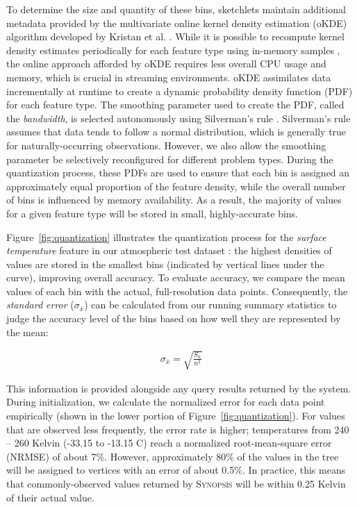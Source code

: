 To determine the size and quantity of these bins, sketchlets maintain additional metadata provided by the multivariate online kernel density estimation (oKDE) algorithm developed by Kristan et al. \cite{kristan2011multivariate}. While it is possible to recompute kernel density estimates periodically for each feature type using in-memory samples \cite{malensek2013autonomously}, the online approach afforded by oKDE requires less overall CPU usage and memory, which is crucial in streaming environments.  oKDE assimilates data incrementally at runtime to create a dynamic probability density function (PDF) for each feature type. The smoothing parameter used to create the PDF, called the \emph{bandwidth}, is selected autonomously using Silverman's rule \cite{silverman1986density}. Silverman's rule assumes that data tends to follow a normal distribution, which is generally true for naturally-occurring observations. However, we also allow the smoothing parameter be selectively reconfigured for different problem types. During the quantization process, these PDFs are used to ensure that each bin is assigned an approximately equal proportion of the feature density, while the overall number of bins is influenced by memory availability. As a result, the majority of values for a given feature type will be stored in small, highly-accurate bins.

Figure~\ref{fig:quantization} illustrates the quantization process for the \emph{surface temperature} feature in our atmospheric test dataset \cite{noaa_nam}: the highest densities of values are stored in the smallest bins (indicated by vertical lines under the curve), improving overall accuracy. To evaluate accuracy, we compare the mean values of each bin with the actual, full-resolution data points. Consequently, the \emph{standard error} ($\sigma_{\bar{x}}$) can be calculated from our running summary statistics to judge the accuracy level of the bins based on how well they are represented by the mean:

\begin{align*}
    \sigma_{\bar{x}} = \sqrt{\frac{S_n}{n^2}}
\end{align*}

This information is provided alongside any query results returned by the system. During initialization, we calculate the normalized error for each data point empirically (shown in the lower portion of Figure~\ref{fig:quantization}). For values that are observed less frequently, the error rate is higher; temperatures from 240 -- 260 Kelvin (-33.15 to -13.15 \degree C) reach a normalized root-mean-square error (NRMSE) of about 7\%. However, approximately 80\% of the values in the tree will be assigned to vertices with an error of about 0.5\%. In practice, this means that commonly-observed values returned by \textsc{Synopsis} will be within 0.25 Kelvin of their actual value.

